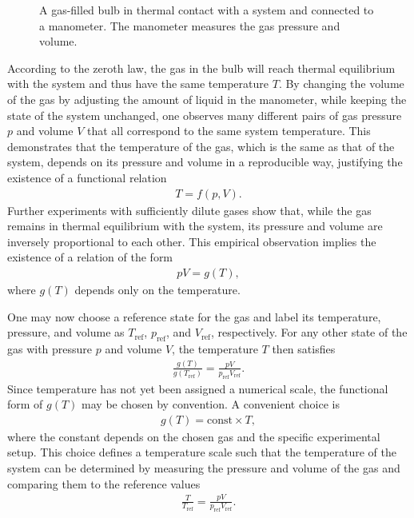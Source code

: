 \begin{figure}[!htb]
    \centering
    
    \caption{A gas-filled bulb in thermal contact with a system and connected to a manometer. The manometer measures the gas pressure and volume.}
    \label{fig:manometer}
\end{figure}

According to the zeroth law, the gas in the bulb will reach thermal equilibrium with the system and thus have the same temperature $T$. By changing the volume of the gas by adjusting the amount of liquid in the manometer, while keeping the state of the system unchanged, one observes many different pairs of gas pressure $p$ and volume $V$ that all correspond to the same system temperature. This demonstrates that the temperature of the gas, which is the same as that of the system, depends on its pressure and volume in a reproducible way, justifying the existence of a functional relation
\begin{align}
    T = f(p,V).
\end{align}
Further experiments with sufficiently dilute gases show that, while the gas remains in thermal equilibrium with the system, its pressure and volume are inversely proportional to each other. This empirical observation implies the existence of a relation of the form
\begin{align}
    pV = g(T),
\end{align}
where $g(T)$ depends only on the temperature.

One may now choose a reference state for the gas and label its temperature, pressure, and volume as $T_\text{ref}$, $p_\text{ref}$, and $V_\text{ref}$, respectively. For any other state of the gas with pressure $p$ and volume $V$, the temperature $T$ then satisfies
\begin{align}
    \frac{g(T)}{g(T_\text{ref})} = \frac{pV}{p_\text{ref}V_\text{ref}}.
\end{align}
Since temperature has not yet been assigned a numerical scale, the functional form of $g(T)$ may be chosen by convention. A convenient choice is
\begin{align}
    g(T) = \text{const}\times T,
\end{align}
where the constant depends on the chosen gas and the specific experimental setup. This choice defines a temperature scale such that the temperature of the system can be determined by measuring the pressure and volume of the gas and comparing them to the reference values
\begin{align}
    \frac{T}{T_\text{ref}} = \frac{pV}{p_\text{ref}V_\text{ref}}.
\end{align}

